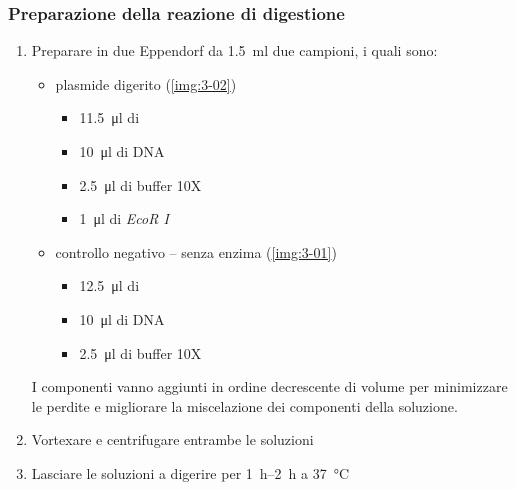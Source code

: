 \subsubsection{Preparazione della reazione di digestione}
\begin{enumerate}
	\item Preparare in due \foreignlanguage{german}{Eppendorf} da \qty{1.5}{\ml} due campioni, i quali sono:
	      \begin{itemize}
		      \item plasmide digerito (\autoref{img:3-02})
		            \begin{itemize}
			            \item \qty{11.5}{\micro\litre} di 
			            \item \qty{10}{\micro\litre} di DNA
			            \item \qty{2.5}{\micro\litre} di buffer 10X
			            \item \qty{1}{\micro\litre} di \emph{EcoR I}
		            \end{itemize}
		      \item controllo negativo -- senza enzima (\autoref{img:3-01})
		            \begin{itemize}
			            \item \qty{12.5}{\micro\litre} di 
			            \item \qty{10}{\micro\litre} di DNA
			            \item \qty{2.5}{\micro\litre} di buffer 10X
		            \end{itemize}
	      \end{itemize}
	      \begin{Note}
		      I componenti vanno aggiunti in ordine decrescente di volume per minimizzare le perdite e migliorare la miscelazione dei componenti della soluzione.
	      \end{Note}
	\item Vortexare e centrifugare entrambe le soluzioni
	\item Lasciare le soluzioni a digerire per \qtyrange{1}{2}{\hour} a \qty{37}{\celsius}
\end{enumerate}


